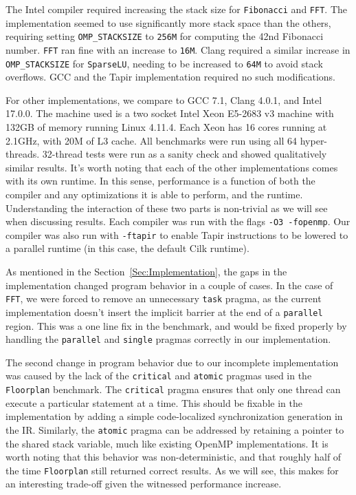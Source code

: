 \documentclass[sigconf]{acmart}
\begin{document}
The Intel compiler required increasing the stack size for \texttt{Fibonacci} and
\texttt{FFT}. The implementation seemed to use significantly more stack space
than the others, requiring setting \texttt{OMP\_STACKSIZE} to \texttt{256M} for
computing the 42nd Fibonacci number. \texttt{FFT} ran fine with an increase to
\texttt{16M}. Clang required a similar increase in \texttt{OMP\_STACKSIZE} for
\texttt{SparseLU}, needing to be increased to \texttt{64M} to avoid stack
overflows. GCC and the Tapir implementation required no such modifications.

For other implementations, we compare to GCC 7.1, Clang 4.0.1, and Intel
17.0.0. The machine used is a two socket Intel Xeon E5-2683 v3 machine with
132GB of memory running Linux 4.11.4. Each Xeon has 16 cores running at
2.1GHz, with 20M of L3 cache. All benchmarks were run using all 64
hyper-threads. 32-thread tests were run as a sanity check and showed
qualitatively similar results. It's worth noting that each of the other
implementations comes with its own runtime. In this sense, performance is a
function of both the compiler and any optimizations it is able to perform, and
the runtime.  Understanding the interaction of these two parts is non-trivial
as we will see when discussing results. Each compiler was run with the flags
\texttt{-O3 -fopenmp}. Our compiler was also run with \texttt{-ftapir} to
enable Tapir instructions to be lowered to a parallel runtime (in this case,
the default Cilk runtime).

As mentioned in the Section~\ref{Sec:Implementation}, the gaps in the implementation
changed program behavior in a couple of cases. In the case of \texttt{FFT}, we were
forced to remove an unnecessary \texttt{task} pragma, as the current implementation
doesn't insert the implicit barrier at the end of a \texttt{parallel} region. This
was a one line fix in the benchmark, and would be fixed properly by handling
the \texttt{parallel} and \texttt{single} pragmas correctly in our implementation.

The second change in program behavior due to our incomplete implementation was
caused by the lack of the \texttt{critical} and \texttt{atomic} pragmas used
in the \texttt{Floorplan} benchmark. The \texttt{critical} pragma
ensures that only one thread can execute a particular statement at a time.
This should be fixable in the implementation by adding a simple code-localized
synchronization generation in the IR\@. Similarly, the \texttt{atomic} pragma
can be addressed by retaining a pointer to the shared stack variable, much like
existing OpenMP implementations. It is worth noting that this behavior was
non-deterministic, and that roughly half of the time \texttt{Floorplan}
still returned correct results. As we will see, this makes for an interesting
trade-off given the witnessed performance increase.
\end{document}
